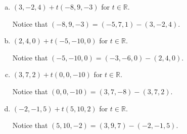 \begin{Exercise}
\begin{enumerate}[(a)]
\item
\begin{answer}
$(3,-2,4) + t(-8,9,-3)$ for $t\in\mathbb{R}$.
\end{answer}
\begin{solution}
Notice that $(-8,9,-3) = (-5,7,1) - (3,-2,4)$.
\end{solution}

\item 
\begin{answer}
$(2,4,0) + t(-5,-10,0)$ for $t\in\mathbb{R}$.
\end{answer}
\begin{solution}
Notice that $(-5,-10,0) = (-3,-6,0) - (2,4,0)$.
\end{solution}

\item 
\begin{answer}
$(3,7,2) + t(0,0,-10)$ for $t\in\mathbb{R}$.
\end{answer}
\begin{solution}
Notice that $(0,0,-10) = (3,7,-8) - (3,7,2)$.
\end{solution}

\item
\begin{answer}
$(-2,-1,5) + t(5,10,2)$ for $t\in\mathbb{R}$.
\end{answer}
\begin{solution}
Notice that $(5,10,-2) = (3,9,7) - (-2,-1,5)$.
\end{solution}
\end{enumerate}
\end{Exercise}